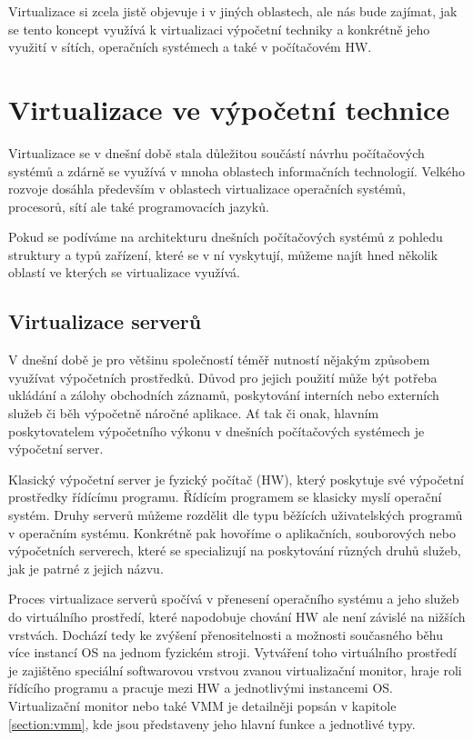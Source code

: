 Virtualizace si zcela jistě objevuje i v jiných oblastech, ale nás bude zajímat, jak se tento koncept využívá k virtualizaci výpočetní techniky a konkrétně jeho využití v sítích, operačních systémech a také 
v počítačovém HW. 

\section{Virtualizace ve výpočetní technice}
\label{section:virtualization_in_it}

Virtualizace se v dnešní době stala důležitou součástí návrhu počítačových systémů a zdárně se využívá v mnoha oblastech informačních technologií. Velkého rozvoje dosáhla především v oblastech virtualizace operačních
systémů, procesorů, sítí ale také programovacích jazyků.

Pokud se podíváme na architekturu dnešních počítačových systémů z pohledu struktury a typů zařízení, které se v ní vyskytují, můžeme najít hned několik oblastí ve kterých se virtualizace využívá. 

  \subsection{Virtualizace serverů}
  \label{subsection:server_virtualization}
  
  V dnešní době je pro většinu společností téměř nutností nějakým způsobem využívat výpočetních prostředků. Důvod pro jejich použití může být potřeba ukládání a zálohy obchodních záznamů, poskytování interních nebo
  externích služeb či běh výpočetně náročné aplikace. Ať tak či onak, hlavním poskytovatelem výpočetního výkonu v dnešních počítačových systémech je výpočetní server.
  
  Klasický výpočetní server je fyzický počítač (HW), který poskytuje své výpočetní prostředky řídícímu programu. Řídícím programem se klasicky myslí operační systém. Druhy serverů můžeme rozdělit dle typu běžících
  uživatelských programů v operačním systému. Konkrétně pak hovoříme o aplikačních, souborových nebo výpočetních serverech, které se specializují na poskytování různých druhů služeb, jak je patrné z jejich názvu.
  
  Proces virtualizace serverů spočívá v přenesení operačního systému a jeho služeb do virtuálního prostředí, které napodobuje chování HW ale není závislé na nižších vrstvách. Dochází tedy ke zvýšení přenositelnosti a
  možnosti současného běhu více instancí OS na jednom fyzickém stroji. Vytváření toho virtuálního prostředí je zajištěno speciální softwarovou vrstvou zvanou virtualizační monitor, hraje roli řídícího programu a
  pracuje mezi HW a jednotlivými instancemi OS. Virtualizační monitor nebo také VMM je detailněji popsán v kapitole \ref{section:vmm}, kde jsou představeny jeho hlavní funkce a jednotlivé typy.
  
